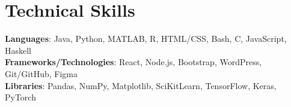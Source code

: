 \section{Technical Skills}
 \begin{itemize}[leftmargin=0.15in, label={}]
    \small{\item{
     \textbf{Languages}{: Java, Python, MATLAB, R, HTML/CSS, Bash, C, JavaScript, Haskell} \\
     \textbf{Frameworks/Technologies}{: React, Node.js, Bootstrap, WordPress, Git/GitHub, Figma} \\
     \textbf{Libraries}{: Pandas, NumPy, Matplotlib, SciKitLearn, TensorFlow, Keras, PyTorch}
    }}
 \end{itemize}